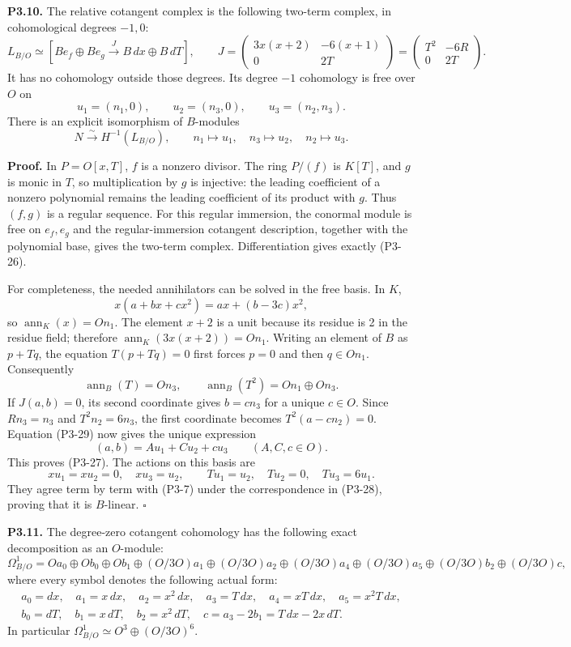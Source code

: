 \documentclass[
  10pt,
]{article}
\begin{document}
\textbf{P3.10.} The relative cotangent complex is the following two-term
complex, in cohomological degrees \(-1,0\): \[
L_{B/O}\simeq
\left[B e_f\oplus B e_g
\xrightarrow{J}B\,dx\oplus B\,dT\right],
\qquad
J=\begin{pmatrix}
3x(x+2)&-6(x+1)\\0&2T
\end{pmatrix}
=\begin{pmatrix}T^2&-6R\\0&2T\end{pmatrix}.
\tag{P3-26}
\] It has no cohomology outside those degrees. Its degree \(-1\)
cohomology is free over \(O\) on \[
u_1=(n_1,0),\qquad u_2=(n_3,0),\qquad
u_3=(n_2,n_3).
\tag{P3-27}
\] There is an explicit isomorphism of \(B\)-modules \[
N\xrightarrow{\sim}H^{-1}(L_{B/O}),
\qquad n_1\mapsto u_1,\quad n_3\mapsto u_2,\quad n_2\mapsto u_3.
\tag{P3-28}
\]

\textbf{Proof.} In \(P=O[x,T]\), \(f\) is a nonzero divisor. The ring
\(P/(f)\) is \(K[T]\), and \(g\) is monic in \(T\), so multiplication by
\(g\) is injective: the leading coefficient of a nonzero polynomial
remains the leading coefficient of its product with \(g\). Thus
\((f,g)\) is a regular sequence. For this regular immersion, the
conormal module is free on \(e_f,e_g\) and the regular-immersion
cotangent description, together with the polynomial base, gives the
two-term complex. Differentiation gives exactly (P3-26).

For completeness, the needed annihilators can be solved in the free
basis. In \(K\), \[
x(a+bx+cx^2)=ax+(b-3c)x^2,
\] so \(\operatorname{ann}_K(x)=On_1\). The element \(x+2\) is a unit
because its residue is 2 in the residue field; therefore
\(\operatorname{ann}_K(3x(x+2))=On_1\). Writing an element of \(B\) as
\(p+Tq\), the equation \(T(p+Tq)=0\) first forces \(p=0\) and then
\(q\in On_1\). Consequently \[
\operatorname{ann}_B(T)=On_3,\qquad
\operatorname{ann}_B(T^2)=On_1\oplus On_3.
\tag{P3-29}
\] If \(J(a,b)=0\), its second coordinate gives \(b=cn_3\) for a unique
\(c\in O\). Since \(Rn_3=n_3\) and \(T^2n_2=6n_3\), the first coordinate
becomes \(T^2(a-cn_2)=0\). Equation (P3-29) now gives the unique
expression \[
(a,b)=Au_1+Cu_2+cu_3\qquad(A,C,c\in O).
\] This proves (P3-27). The actions on this basis are \[
xu_1=xu_2=0,\quad xu_3=u_2,\qquad
Tu_1=u_2,\quad Tu_2=0,\quad Tu_3=6u_1.
\] They agree term by term with (P3-7) under the correspondence in
(P3-28), proving that it is \(B\)-linear. \(\square\)

\textbf{P3.11.} The degree-zero cotangent cohomology has the following
exact decomposition as an \(O\)-module: \[
\Omega^1_{B/O}
=Oa_0\oplus Ob_0\oplus Ob_1
\oplus(O/3O)a_1\oplus(O/3O)a_2
\oplus(O/3O)a_4\oplus(O/3O)a_5
\oplus(O/3O)b_2\oplus(O/3O)c,
\tag{P3-30}
\] where every symbol denotes the following actual form: \[
\begin{gathered}
a_0=dx,\quad a_1=x\,dx,\quad a_2=x^2\,dx,\quad
a_3=T\,dx,\quad a_4=xT\,dx,\quad a_5=x^2T\,dx,\\
b_0=dT,\quad b_1=x\,dT,\quad b_2=x^2\,dT,\quad
c=a_3-2b_1=T\,dx-2x\,dT.
\end{gathered}
\tag{P3-31}
\] In particular \(\Omega^1_{B/O}\simeq O^3\oplus(O/3O)^6\).
\end{document}

